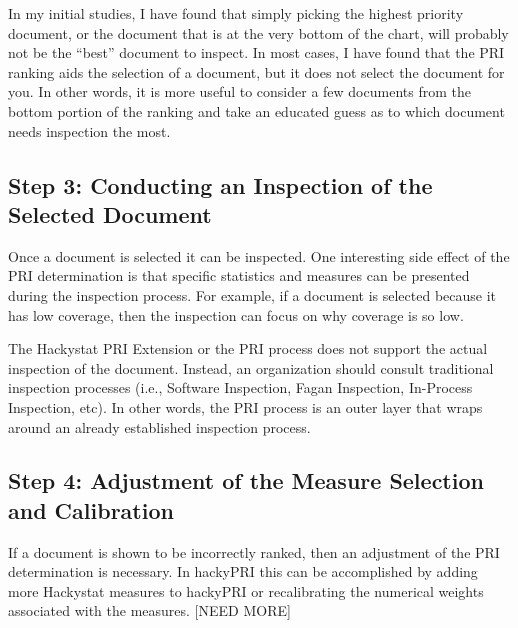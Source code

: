 In my initial studies, I have found that simply picking the highest
priority document, or the document that is at the very bottom of the chart,
will probably not be the ``best'' document to inspect. In most cases, I
have found that the PRI ranking aids the selection of a document, but it
does not select the document for you. In other words, it is more useful to
consider a few documents from the bottom portion of the ranking and take an
educated guess as to which document needs inspection the most.

\subsection{Step 3: Conducting an Inspection of the Selected Document}
Once a document is selected it can be inspected. One interesting side
effect of the PRI determination is that specific statistics and measures
can be presented during the inspection process. For example, if a document
is selected because it has low coverage, then the inspection can focus on
why coverage is so low.

The Hackystat PRI Extension or the PRI process does not support the actual
inspection of the document. Instead, an organization should consult
traditional inspection processes (i.e., Software Inspection, Fagan
Inspection, In-Process Inspection, etc). In other words, the PRI process is
an outer layer that wraps around an already established inspection process.

\subsection{Step 4: Adjustment of the Measure Selection and Calibration}
If a document is shown to be incorrectly ranked, then an adjustment of the
PRI determination is necessary. In hackyPRI this can be accomplished by
adding more Hackystat measures to hackyPRI or recalibrating the numerical
weights associated with the measures. [NEED MORE]







